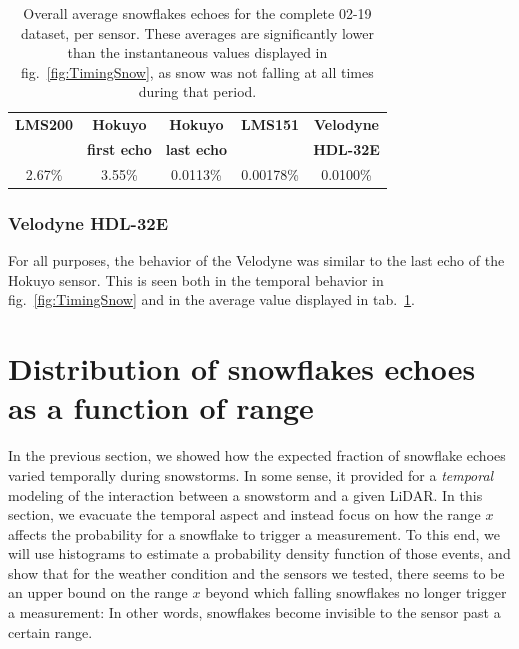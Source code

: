 \begin{table}[htbp]
    \centering
    \begin{tabular}{|c|c|c|c|c|}
        \hline
        \textbf{LMS200}       & \textbf{Hokuyo}             & \textbf{Hokuyo}    & \textbf{LMS151}  & \textbf{Velodyne}  \\
                                        & \textbf{first echo}   & \textbf{last echo}  &                            & \textbf{HDL-32E}  \\\hline
                 2.67\%            &           3.55\%                &       0.0113\%      &       0.00178\%     &  0.0100\%  \\\hline
    \end{tabular}
    \caption{Overall average snowflakes echoes for the complete 02-19 dataset, per sensor. These averages are significantly lower than the instantaneous values displayed in fig.~\ref{fig:TimingSnow}, as snow was not falling at all times during that period.}
    \label{tab:avgRates}
\end{table}

\subsubsection{Velodyne HDL-32E}
For all purposes, the behavior of the Velodyne was similar to the last echo of the Hokuyo sensor. This is seen both in the temporal behavior in fig.~\ref{fig:TimingSnow} and in the average value displayed in tab.~\ref{tab:avgRates}.

\section{Distribution of snowflakes echoes as a function of range}
\label{sec:Histo}

In the previous section, we showed how the expected fraction of snowflake echoes varied temporally during snowstorms. In some sense, it provided for a \emph{temporal} modeling of the interaction between a snowstorm and a given LiDAR. In this section, we evacuate the temporal aspect and instead focus on how the range $x$ affects the probability for a snowflake to trigger a measurement. To this end, we will use histograms to estimate a probability density function of those events, and show that for the weather condition and the sensors we tested, there seems to be an upper bound on the range $x$ beyond which falling snowflakes no longer trigger a measurement: In other words, snowflakes become invisible to the sensor past a certain range.

